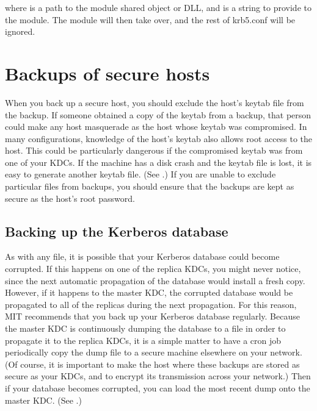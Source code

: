 \documentclass[letterpaper,10pt,english]{sphinxmanual}
\begin{document}
%
\begin{sphinxVerbatim}[commandchars=\\\{\}]
 
\end{sphinxVerbatim}

where  is a path to the module shared object or DLL, and
 is a string to provide to the module.  The module will then
take over, and the rest of krb5.conf will be ignored.


\chapter{Backups of secure hosts}
\label{\detokenize{admin/backup_host:backups-of-secure-hosts}}\label{\detokenize{admin/backup_host::doc}}
When you back up a secure host, you should exclude the host’s keytab
file from the backup.  If someone obtained a copy of the keytab from a
backup, that person could make any host masquerade as the host whose
keytab was compromised.  In many configurations, knowledge of the
host’s keytab also allows root access to the host.  This could be
particularly dangerous if the compromised keytab was from one of your
KDCs.  If the machine has a disk crash and the keytab file is lost, it
is easy to generate another keytab file.  (See {\hyperref[\detokenize{admin/appl_servers:add-princ-kt}]{}}.)
If you are unable to exclude particular files from backups, you should
ensure that the backups are kept as secure as the host’s root
password.


\section{Backing up the Kerberos database}
\label{\detokenize{admin/backup_host:backing-up-the-kerberos-database}}
As with any file, it is possible that your Kerberos database could
become corrupted.  If this happens on one of the replica KDCs, you
might never notice, since the next automatic propagation of the
database would install a fresh copy.  However, if it happens to the
master KDC, the corrupted database would be propagated to all of the
replicas during the next propagation.  For this reason, MIT recommends
that you back up your Kerberos database regularly.  Because the master
KDC is continuously dumping the database to a file in order to
propagate it to the replica KDCs, it is a simple matter to have a cron
job periodically copy the dump file to a secure machine elsewhere on
your network.  (Of course, it is important to make the host where
these backups are stored as secure as your KDCs, and to encrypt its
transmission across your network.)  Then if your database becomes
corrupted, you can load the most recent dump onto the master KDC.
(See {\hyperref[\detokenize{admin/database:restore-from-dump}]{}}.)
\end{document}
